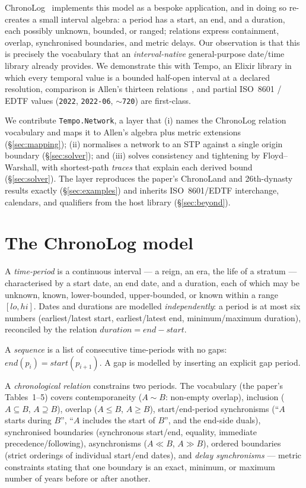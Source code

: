 \documentclass[a4paper,USenglish,cleveref,autoref,thm-restate]{oasics-v2021}
\begin{document}
ChronoLog~\cite{chronolog} implements this model as a bespoke
application, and in doing so re-creates a small interval algebra: a
period has a start, an end, and a duration, each possibly unknown,
bounded, or ranged; relations express containment, overlap, synchronised
boundaries, and metric delays. Our observation is that this is precisely
the vocabulary that an \emph{interval-native} general-purpose date/time
library already provides. We demonstrate this with Tempo, an Elixir
library in which every temporal value is a bounded half-open interval at
a declared resolution, comparison is Allen's thirteen
relations~\cite{allen1983}, and partial ISO~8601 / EDTF values
(\texttt{2022}, \texttt{2022-06}, \texttt{$\sim$720}) are first-class.

We contribute \texttt{Tempo.Network}, a layer that (i) names the
ChronoLog relation vocabulary and maps it to Allen's algebra plus metric
extensions (§\ref{sec:mapping}); (ii) normalises a network to an STP
against a single origin boundary (§\ref{sec:solver}); and (iii) solves
consistency and tightening by Floyd--Warshall, with shortest-path
\emph{traces} that explain each derived bound (§\ref{sec:solver}). The
layer reproduces the paper's ChronoLand and 26th-dynasty results exactly
(§\ref{sec:examples}) and inherits ISO~8601/EDTF interchange, calendars,
and qualifiers from the host library (§\ref{sec:beyond}).

\section{The ChronoLog model}
\label{sec:chronolog}

A \emph{time-period} is a continuous interval --- a reign, an era, the
life of a stratum --- characterised by a start date, an end date, and a
duration, each of which may be unknown, known, lower-bounded,
upper-bounded, or known within a range $[lo, hi]$. Dates and durations
are modelled \emph{independently}: a period is at most six numbers
(earliest/latest start, earliest/latest end, minimum/maximum duration),
reconciled by the relation $\textit{duration} = \textit{end} -
\textit{start}$.

A \emph{sequence} is a list of consecutive time-periods with no gaps:
$\textit{end}(p_i) = \textit{start}(p_{i+1})$. A gap is modelled by
inserting an explicit gap period.

A \emph{chronological relation} constrains two periods. The vocabulary
(the paper's Tables~1--5) covers contemporaneity ($A \sim B$: non-empty
overlap), inclusion ($A \subseteq B$, $A \supseteq B$), overlap ($A \leq
B$, $A \geq B$), start/end-period synchronisms (``$A$ starts during
$B$'', ``$A$ includes the start of $B$'', and the end-side duals),
synchronised boundaries (synchronous start/end, equality, immediate
precedence/following), asynchronisms ($A \ll B$, $A \gg B$), ordered
boundaries (strict orderings of individual start/end dates), and
\emph{delay synchronisms} --- metric constraints stating that one
boundary is an exact, minimum, or maximum number of years before or
after another.
\end{document}
